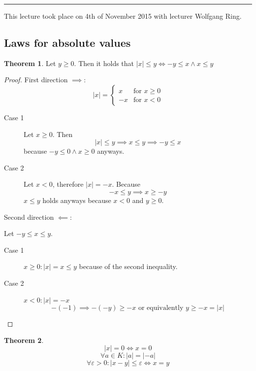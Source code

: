 \documentclass[a4paper,landscape,twocolumn]{article}
\theoremstyle{definition}
\newtheorem{theorem}{Theorem}
\newcommand\abs[1]{\left|#1\right|}
\newcommand\meta[3]{\hrule{} This #1 took place on #2 with lecturer #3.\par}
\begin{document}
\meta{lecture}{4th of November 2015}{Wolfgang Ring}

\subsection{Laws for absolute values}
%
\begin{theorem}
  Let $y \geq 0$. Then it holds that $\abs{x} \leq y \Leftrightarrow -y \leq x \land x \leq y$
\end{theorem}
\begin{proof}
  First direction $\implies$:
  \[
    \abs{x} = \begin{cases}
      x & \text{for } x \geq 0\\
      -x & \text{for } x < 0
    \end{cases}
  \]
  \begin{description}
    \item[Case 1] Let $x \geq 0$. Then
      \[ \abs{x} \leq y \implies x \leq y \implies -y \leq x \]
      because $-y \leq 0 \land x \geq 0$ anyways.
    \item[Case 2] Let $x < 0$, therefore $\abs{x} = -x$. Because
      \[ -x \leq y \implies x \geq -y \]
      $x \leq y$ holds anyways because $x < 0$ and $y \geq 0$.
  \end{description}

  Second direction $\impliedby$:

  Let $-y \leq x \leq y$.
  \begin{description}
    \item[Case 1] $x \geq 0: \abs{x} = x \leq y$ because of the second inequality.
    \item[Case 2] $x < 0: \abs{x} = -x$
      \[ -(-1) \implies -(-y) \geq -x \text{ or equivalently } y \geq -x = \abs{x} \]
  \end{description}
\end{proof}

\begin{theorem}
  \[ \abs{x} = 0 \Leftrightarrow x = 0 \]
  \[ \forall a \in K: \abs{a} = \abs{-a} \]
  \[ \forall \varepsilon > 0: \abs{x - y} \leq \varepsilon \Leftrightarrow x = y \]
\end{theorem}
\end{document}
